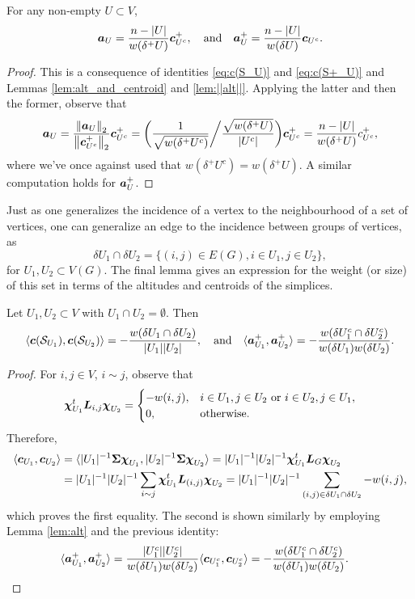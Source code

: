 \begin{lemma}
\label{lem:alt}
For any non-empty $U\subset V$, 
\[\vb*{a}_U=\frac{n-|U|}{w(\delta^+ U)}\vb*{c}^+_{U^c},\quad \text{and}\quad \vb*{a}^+_U = \frac{n-|U|}{w(\delta U)} \vb*{c}_{U^c}.\]
\end{lemma}
\begin{proof}
This is a consequence of identities \eqref{eq:c(S_U)} and \eqref{eq:c(S+_U)} and Lemmas \ref{lem:alt_and_centroid} and \ref{lem:||alt||}. Applying the latter and then the former, observe that 
	\[\vb*{a}_U = \frac{\norm{\vb*{a}_U}_2}{\norm{\vb*{c}^+_{U^c}}_2}\vb*{c}^+_{U^c} =
\bigg(\frac{1}{\sqrt{w(\delta^+ U^c)}} \bigg/\frac{\sqrt{w(\delta^+U)}}{|U^c|} \bigg)\vb*{c}^+_{U^c} = \frac{n-|U|}{w(\delta^+U)}c^+_{U^c},\]
where we've once against used that $w(\delta^+ U^c )=w(\delta^+ U)$. A similar computation holds for $\vb*{a}_U^+$.  
\end{proof}

Just as one generalizes the incidence of a vertex to the neighbourhood of a set of vertices, one can generalize an edge to the incidence between groups of vertices, as
\[\delta U_1\cap \delta U_2 = \{(i,j)\in E(G), i\in U_1,j\in U_2\},\]
for $U_1,U_2\subset V(G)$. The final lemma gives an expression for the weight (or size) of this set in terms of the altitudes and centroids of the simplices. 


\begin{lemma}
	\label{lem:alt_centroid_dot_product}
Let $U_1,U_2\subset V$ with $U_1\cap U_2=\emptyset$. Then 
\begin{equation*}
    \langle \vb*{c}(\mathcal{S}_{U_1}),\vb*{c}(\mathcal{S}_{U_2})\rangle = - \frac{w(\delta U_1\cap \delta U_2)}{|U_1||U_2|},\quad\text{and}\quad \langle \vb*{a}^+_{U_1},\vb*{a}^+_{U_2}\rangle = -\frac{w(\delta U_1^c\cap \delta U_2^c)}{w(\delta U_1)w(\delta U_2)}.
\end{equation*}
\end{lemma}
\begin{proof}
For $i,j\in V$, $i\sim j$, observe that 
\[\boldsymbol{\chi}_{U_1}^t \vb*{L}_{i,j}\boldsymbol{\chi}_{U_2}=
\begin{cases}
-w(i,j),& i\in U_1,j\in U_2\text{ or }i\in U_2,j\in U_1,\\
0,&\text{otherwise.}
\end{cases}\]
Therefore, 
\begin{align*}
    \langle \vb*{c}_{U_1},\vb*{c}_{U_2}\rangle &= \langle |U_1|^{-1}\boldsymbol{\Sigma}\boldsymbol{\chi}_{U_1},|U_2|^{-1}\boldsymbol{\Sigma}\boldsymbol{\chi}_{U_2}\rangle = |U_1|^{-1}|U_2|^{-1} \boldsymbol{\chi}_{U_1}^t \vb*{L}_G\boldsymbol{\chi}_{U_2} \\
    &= |U_1|^{-1}|U_2|^{-1}\sum_{i\sim j} \boldsymbol{\chi}_{U_1}^t \vb*{L}_{(i,j)}\boldsymbol{\chi}_{U_2} = |U_1|^{-1}|U_2|^{-1}\sum_{(i,j)\in \delta U_1\cap \delta U_2} -w(i,j),
\end{align*}
which proves the first equality. The second is shown similarly by employing Lemma \ref{lem:alt} and the previous identity:
\begin{align*}
    \langle \vb*{a}^+_{U_1},\vb*{a}^+_{U_2}\rangle &= \frac{|U_1^c||U_2^c|}{w(\delta U_1) w(\delta U_2)}\langle \vb*{c}_{U_1^c},\vb*{c}_{U_2^c}\rangle
    =-\frac{w(\delta U_1^c\cap \delta U_2^c)}{w(\delta U_1)w(\delta U_2)}.\qedhere
\end{align*}
\end{proof}

